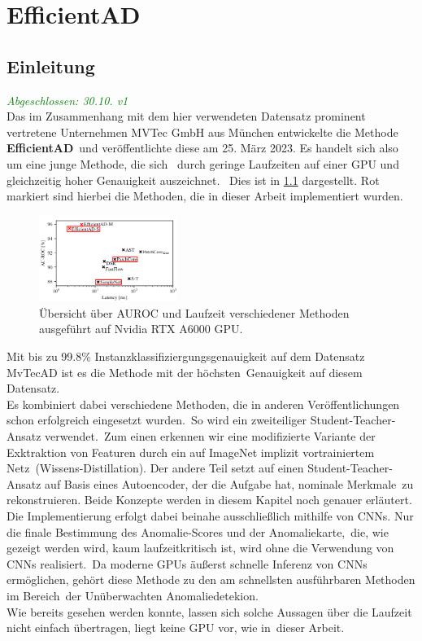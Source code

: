
\chapter{EfficientAD} \label{ch:EfficientAD}
\section{Einleitung} \label{sec:Einleitung}
\textcolor{green}{\textit{Abgeschlossen: 30.10. v1}}\\
Das im Zusammenhang mit dem hier verwendeten Datensatz prominent vertretene Unternehmen MVTec GmbH aus München entwickelte die Methode \textbf{EfficientAD}\ 
und veröffentlichte diese am 25. März 2023. Es handelt sich also um eine junge Methode, die sich \
durch geringe Laufzeiten auf einer GPU und gleichzeitig hoher Genauigkeit auszeichnet. \
Dies ist in \ref{fig:efficientadoverview} dargestellt. Rot markiert sind hierbei die Methoden, die in dieser Arbeit implementiert wurden. \
\begin{figure}[h]
    \centering
    \includegraphics[width=0.4\textwidth]{bilder/overviewspeedauroc.png}
    \caption{Übersicht über AUROC und Laufzeit verschiedener Methoden ausgeführt auf Nvidia RTX A6000 GPU. \cite{efficientad}}
    \label{fig:efficientadoverview}
\end{figure}
Mit bis zu \num{99,8}\% Instanzklassifiziergungsgenauigkeit auf dem Datensatz MvTecAD ist es die Methode mit der höchsten\
Genauigkeit auf diesem Datensatz. \cite{paperswithcode}\\
Es kombiniert dabei verschiedene Methoden, die in anderen Veröffentlichungen schon erfolgreich eingesetzt wurden.\
So wird ein zweiteiliger \glqq Student-Teacher\grqq{}-Ansatz verwendet.\
Zum einen erkennen wir eine modifizierte Variante der Exktraktion von Featuren durch ein auf ImageNet implizit vortrainiertem Netz\
(Wissens-Distillation). Der andere Teil setzt auf einen Student-Teacher-Ansatz auf Basis eines Autoencoder, der die Aufgabe hat, nominale Merkmale\
zu rekonstruieren. Beide Konzepte werden in diesem Kapitel noch genauer erläutert.\\
Die Implementierung erfolgt dabei beinahe ausschließlich mithilfe von CNNs. Nur die finale Bestimmung des Anomalie-Scores und der Anomaliekarte,\
die, wie gezeigt werden wird, kaum laufzeitkritisch ist, wird ohne die Verwendung von CNNs realisiert.\
Da moderne GPUs äußerst schnelle Inferenz von CNNs ermöglichen, gehört diese Methode zu den am schnellsten ausführbaren Methoden im Bereich\
der Unüberwachten Anomaliedetekion.\cite{efficientad}\cite{paperswithcode} \\
Wie bereits gesehen werden konnte, lassen sich solche Aussagen über die Laufzeit nicht einfach übertragen, liegt keine GPU vor, wie in\
dieser Arbeit.\\
